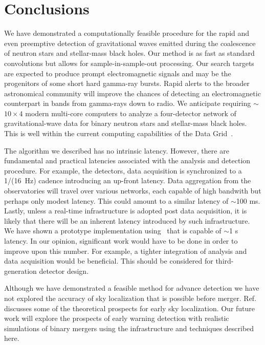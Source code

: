 \section{Conclusions}
\label{SECV}\label{sec:conclusions}

We have demonstrated a computationally feasible procedure for the rapid and even preemptive
detection of gravitational waves emitted during the coalescence of neutron
stars and stellar-mass black holes. Our method is as fast as standard \fft{}
convolutions but allows for sample-in-sample-out processing.
Our search targets are expected to
produce prompt electromagnetic signals and may be the progenitors of some short
hard gamma-ray bursts.  Rapid alerts to the broader astronomical community will
improve the chances of detecting an electromagnetic counterpart in bands from
gamma-rays down to radio.  We anticipate requiring $\sim$$10\times4$ modern
multi-core computers to analyze a four-detector network of gravitational-wave data
for binary neutron stars and stellar-mass black holes.  This is well within the
current computing capabilities of the \LIGO{} Data Grid~\cite{LDG}.

The algorithm we described has no intrinsic latency.  However, there are
fundamental and practical latencies associated with the analysis and detection
procedure. For example, the \LIGO{} detectors, data acquisition is synchronized
to a 1/(16~Hz) cadence introducing an up-front latency.  Data
aggregation from the observatories will travel over various networks, each
capable of high bandwith but perhaps only modest latency.  This could amount to
a similar latency of $\sim$100 ms.  Lastly, unless a real-time infrastructure is
adopted post data acquisition, it is likely that there will be an inherent
latency introduced by such infrastructure.  We have shown a prototype
implementation using \gstlal\ that is capable of $\sim$1 s latency. In our
opinion, significant work would have to be done in order to improve upon this
number. For example, a tighter integration of analysis and data acquisition
would be beneficial. This should be considered for third-generation detector
design.

Although we have demonstrated a feasible method for advance detection we have
not explored the accuracy of sky localization that is possible before merger.
Ref.~\cite{Fairhurst2009} discusses some of the theoretical prospects for early sky
localization.  Our future work will explore the prospects of early warning
detection with realistic simulations of binary mergers using the infrastructure
and techniques described here. 

